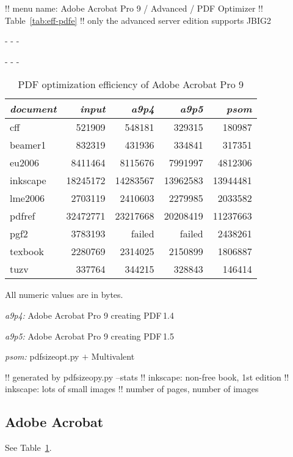 \documentclass{ltugproc}
\def\cmd{\textsf}
\def\captiontop#1{%
  \advance\abovecaptionskip-\belowcaptionskip
  \advance\belowcaptionskip\abovecaptionskip
  \advance\abovecaptionskip-\belowcaptionskip
  \abovecaptionskip-\abovecaptionskip
  \caption{#1}%
  \advance\abovecaptionskip-\belowcaptionskip
  \advance\belowcaptionskip\abovecaptionskip
  \advance\abovecaptionskip-\belowcaptionskip
  \abovecaptionskip-\abovecaptionskip
}
\begin{document}
!! menu name: Adobe Acrobat Pro 9 / Advanced / PDF Optimizer
!! Table~\ref{tab:eff-pdfe}
!! only the advanced server edition supports JBIG2

\begin{table}
\captiontop{PDF optimization efficiency
of Adobe Acrobat Pro 9}\label{tab:eff-a9}
\par\small\noindent\hfil
\advance\tabcolsep-2pt  %
\begin{tabular}{@{}lrrrr@{}}
\toprule
\emph{document} & \emph{input} & \emph{a9p4} & \emph{a9p5} & \emph{psom} \\\midrule
cff         &   521909 &   548181 &   329315 &   180987 \\
beamer1     &   832319 &   431936 &   334841 &   317351 \\
eu2006      &  8411464 &  8115676 &  7991997 &  4812306 \\
inkscape    & 18245172 & 14283567 & 13962583 & 13944481 \\
lme2006     &  2703119 &  2410603 &  2279985 &  2033582 \\
pdfref      & 32472771 & 23217668 & 20208419 & 11237663 \\
pgf2        &  3783193 &   failed &   failed &  2438261 \\
texbook     &  2280769 &  2314025 &  2150899 &  1806887 \\
tuzv        &   337764 &   344215 &   328843 &   146414 \\
\bottomrule
\end{tabular}
\par\bigskip
\par\noindent All numeric values are in bytes.
\par\noindent\emph{a9p4:} Adobe Acrobat Pro 9 creating PDF\,1.4
\par\noindent\emph{a9p5:} Adobe Acrobat Pro 9 creating PDF\,1.5
\par\noindent\emph{psom:} \cmd{pdfsizeopt.py} $+$ Multivalent
\end{table}



!! generated by pdfsizeopy.py --stats
!! inkscape: non-free book, 1st edition
!! inkscape: lots of small images
!! number of pages, number of images

\subsection{Adobe Acrobat}

See Table~\ref{tab:eff-a9}.
\end{document}
